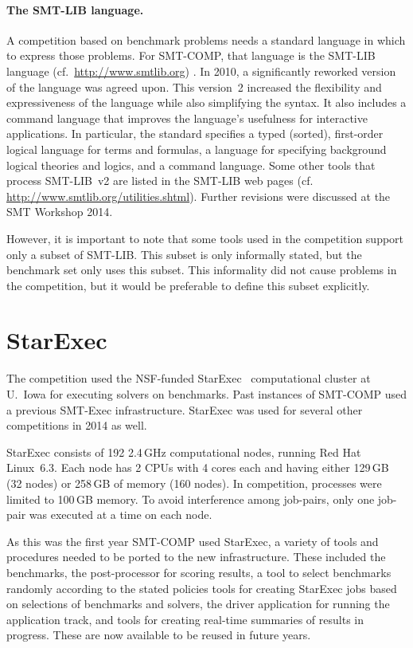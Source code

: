 \documentclass[twoside,11pt]{article}
\begin{document}
\paragraph{The SMT-LIB language.} A competition based on benchmark problems needs a standard language in which to express those problems.
For SMT-COMP, that language is the SMT-LIB language (cf.~\url{http://www.smtlib.org}) \cite{BarST-SMT-10,Cok-SMTLIBTutorial-2011}.
In 2010, a significantly reworked version of the language was agreed upon.
This version~2 increased the flexibility and expressiveness of the language while also simplifying the syntax. 
It also includes a command language that improves the language's usefulness for interactive applications.
In particular, the standard specifies a typed (sorted), first-order logical language for terms and formulas, a language for specifying background logical theories and logics, and a command language. Some other tools that process SMT-LIB~v2 are listed in the SMT-LIB web pages (cf. \url{http://www.smtlib.org/utilities.shtml}). Further revisions were discussed at the SMT Workshop 2014.

However, it is important to note that some tools used in the competition support only a subset of SMT-LIB. This subset is only informally stated, but the benchmark set only uses this subset. This informality did not cause problems in the competition, but it would be preferable to define this subset explicitly.

\section{StarExec}
\label{sec:starexec}

The competition used the NSF-funded StarExec~\cite{DBLP:conf/cade/StumpST14} computational cluster at U.~Iowa for executing solvers on benchmarks. Past instances of SMT-COMP used a previous SMT-Exec infrastructure. StarExec was used for several other competitions in 2014 as well.

StarExec consists of 192 2.4\,GHz computational nodes, running Red Hat Linux~6.3. Each node has 2 CPUs with 4 cores each and having either 129\,GB (32 nodes) or 258\,GB of memory (160 nodes). In competition, processes were limited to 100\,GB memory. To avoid interference among job-pairs, only one job-pair was executed at a time on each node.

As this was the first year SMT-COMP used StarExec, a variety of tools and procedures needed to be ported to the new infrastructure. 
These included the benchmarks, the post-processor for scoring results, 
a tool to select benchmarks randomly according to the stated policies
tools for creating StarExec jobs based on selections of benchmarks and solvers, 
the driver application for running the application track, 
and tools for creating real-time summaries of results in progress. 
These are now available to be reused in future years.
\end{document}
